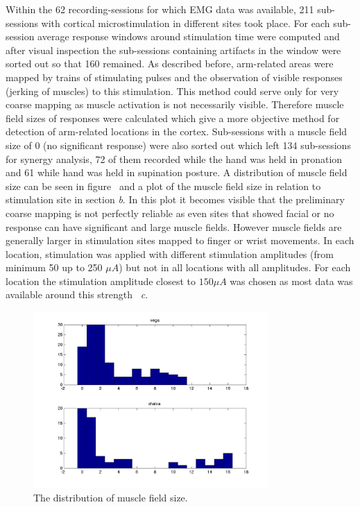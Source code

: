 Within the 62  recording-sessions for which EMG data was available, 211 sub-sessions with cortical microstimulation in different sites took place. For each sub-session average response windows around stimulation time were computed and after visual inspection the sub-sessions containing artifacts in the window were sorted out so that 160 remained. As described before, arm-related areas were mapped by trains of stimulating pulses and the observation of visible responses (jerking of muscles) to this stimulation. This method could serve only for very coarse mapping as muscle activation is not necessarily visible. Therefore muscle field sizes of responses were calculated which give a more objective method for detection of arm-related locations in the cortex. Sub-sessions with a muscle field size of 0 (no significant response) were also sorted out which left 134 sub-sessions for synergy analysis, 72 of them recorded while the hand was held in pronation and 61 while hand was held in supination posture.
A distribution of muscle field size can be seen in figure~  and a plot of the muscle field size in relation to stimulation site in section \emph{b}. In this plot it becomes visible that the preliminary coarse mapping is not perfectly reliable as even sites that showed facial or no response can have significant and large muscle fields. However muscle fields are generally larger in stimulation sites mapped to finger or wrist movements. 
In each location, stimulation was applied with different stimulation amplitudes (from minimum 50 up to 250 $\mu A$) but not in all locations with all amplitudes. For each location the stimulation amplitude closest to $150 \mu A$ was chosen as most data was available around this strength~ \emph{c}.

\begin{figure}[ht]
    \centering
        \includegraphics[width=0.8\textwidth]{images/resp_fields.jpg}
    \caption{The distribution of muscle field size.}
    \label{sg:fig:images_resp_fields}
\end{figure}

